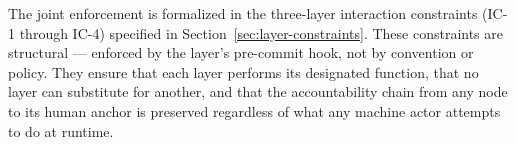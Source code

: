 The joint enforcement is formalized in the three-layer interaction constraints
(IC-1 through IC-4) specified in Section~\ref{sec:layer-constraints}.  These
constraints are structural — enforced by the \fact{} layer's pre-commit hook,
not by convention or policy.  They ensure that each layer performs its
designated function, that no layer can substitute for another, and that the
accountability chain from any node to its human anchor is preserved regardless
of what any machine actor attempts to do at runtime.
